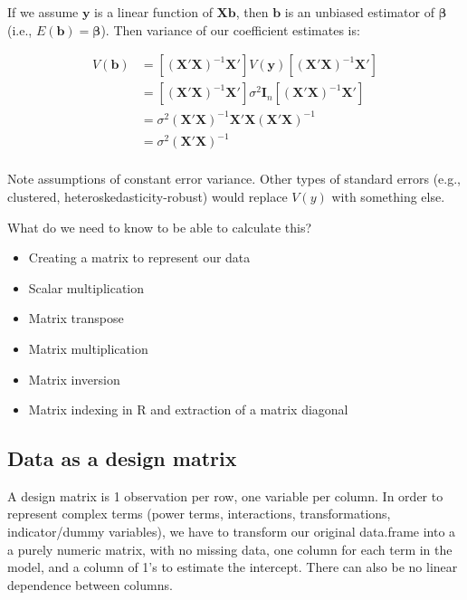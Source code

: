 \documentclass[a4paper,12pt]{article}
\newcommand{\matr}[1]{\mathbf{#1}}
\begin{document}
If we assume $\matr{y}$ is a linear function of $\matr{X}\matr{b}$, then $\matr{b}$ is an unbiased estimator of $\matr{\beta}$ (i.e., $E(\matr{b}) = \matr{\beta}$). Then variance of our coefficient estimates is:

\begin{align*}
V(\matr{b}) & = \left[(\matr{X}'\matr{X})^{-1}\matr{X}'\right] V(\matr{y}) \left[(\matr{X}'\matr{X})^{-1}\matr{X}'\right] \\
  & = \left[(\matr{X}'\matr{X})^{-1}\matr{X}'\right] \sigma^2 \matr{I}_n \left[(\matr{X}'\matr{X})^{-1}\matr{X}'\right] \\
  & = \sigma^2 (\matr{X}'\matr{X})^{-1}\matr{X}'\matr{X}(\matr{X}'\matr{X})^{-1}\\
  & = \sigma^2 (\matr{X}'\matr{X})^{-1}\\
\end{align*}

Note assumptions of constant error variance. Other types of standard errors (e.g., clustered, heteroskedasticity-robust) would replace $V(y)$ with something else.


\vspace{1em}
What do we need to know to be able to calculate this?

\begin{itemize}
\item Creating a matrix to represent our data
\item Scalar multiplication
\item Matrix transpose
\item Matrix multiplication
\item Matrix inversion
\item Matrix indexing in R and extraction of a matrix diagonal
\end{itemize}

\subsection{Data as a \textbf{design matrix}}

A design matrix is 1 observation per row, one variable per column. In order to represent complex terms (power terms, interactions, transformations, indicator/dummy variables), we have to transform our original data.frame into a a purely numeric matrix, with no missing data, one column for each term in the model, and a column of 1's to estimate the intercept. There can also be no linear dependence between columns.
\end{document}
